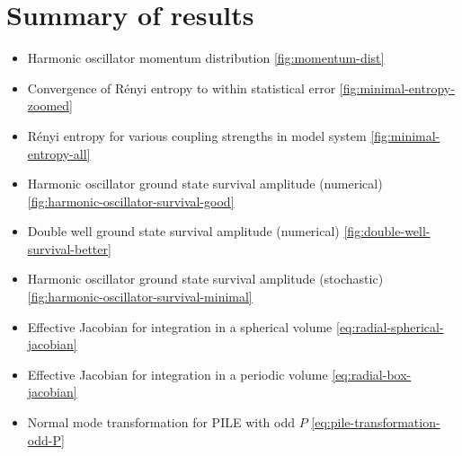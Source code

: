 \chapter{Summary of results}

\begin{itemize}[label={}]
	\item Harmonic oscillator momentum distribution \DOTS \vref{fig:momentum-dist}
	\item Convergence of Rényi entropy to within statistical error \DOTS \vref{fig:minimal-entropy-zoomed}
	\item Rényi entropy for various coupling strengths in model system \DOTS \vref{fig:minimal-entropy-all}
\end{itemize}
\begin{itemize}[label={}]
	\item Harmonic oscillator ground state survival amplitude (numerical) \DOTS \vref{fig:harmonic-oscillator-survival-good}
	\item Double well ground state survival amplitude (numerical) \DOTS \vref{fig:double-well-survival-better}
	\item Harmonic oscillator ground state survival amplitude (stochastic) \DOTS \vref{fig:harmonic-oscillator-survival-minimal}
\end{itemize}
\begin{itemize}[label={}]
	\item Effective Jacobian for integration in a spherical volume \DOTS \vref{eq:radial-spherical-jacobian}
	\item Effective Jacobian for integration in a periodic volume \DOTS \vref{eq:radial-box-jacobian}
	\item Normal mode transformation for PILE with odd $P$ \DOTS \vref{eq:pile-transformation-odd-P}
\end{itemize}
